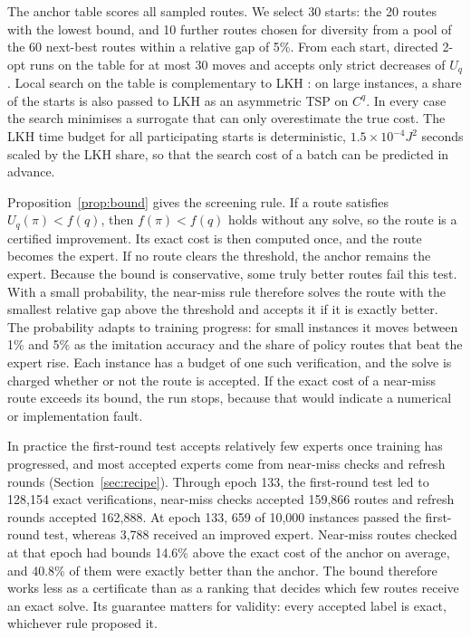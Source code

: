 \documentclass[preprint,12pt,authoryear]{elsarticle}
\begin{document}
The anchor table scores all sampled routes. We select 30 starts: the 20 routes with the lowest bound, and 10 further routes chosen for diversity from a pool of the 60 next-best routes within a relative gap of 5\%. From each start, directed 2-opt runs on the table for at most 30 moves and accepts only strict decreases of $U_{q}$. Local search on the table is complementary to LKH \citep{lin1973,helsgaun2000}: on large instances, a share of the starts is also passed to LKH as an asymmetric TSP on $C^{q}$. In every case the search minimises a surrogate that can only overestimate the true cost. The LKH time budget for all participating starts is deterministic, $1.5 \times 10^{-4} J^{2}$ seconds scaled by the LKH share, so that the search cost of a batch can be predicted in advance.

Proposition~\ref{prop:bound} gives the screening rule. If a route satisfies $U_{q}(\pi) < f(q)$, then $f(\pi) < f(q)$ holds without any solve, so the route is a certified improvement. Its exact cost is then computed once, and the route becomes the expert. If no route clears the threshold, the anchor remains the expert. Because the bound is conservative, some truly better routes fail this test. With a small probability, the near-miss rule therefore solves the route with the smallest relative gap above the threshold and accepts it if it is exactly better. The probability adapts to training progress: for small instances it moves between 1\% and 5\% as the imitation accuracy and the share of policy routes that beat the expert rise. Each instance has a budget of one such verification, and the solve is charged whether or not the route is accepted. If the exact cost of a near-miss route exceeds its bound, the run stops, because that would indicate a numerical or implementation fault.

In practice the first-round test accepts relatively few experts once training has progressed, and most accepted experts come from near-miss checks and refresh rounds (Section~\ref{sec:recipe}). Through epoch 133, the first-round test led to 128,154 exact verifications, near-miss checks accepted 159,866 routes and refresh rounds accepted 162,888. At epoch 133, 659 of 10,000 instances passed the first-round test, whereas 3,788 received an improved expert. Near-miss routes checked at that epoch had bounds 14.6\% above the exact cost of the anchor on average, and 40.8\% of them were exactly better than the anchor. The bound therefore works less as a certificate than as a ranking that decides which few routes receive an exact solve. Its guarantee matters for validity: every accepted label is exact, whichever rule proposed it.
\end{document}
